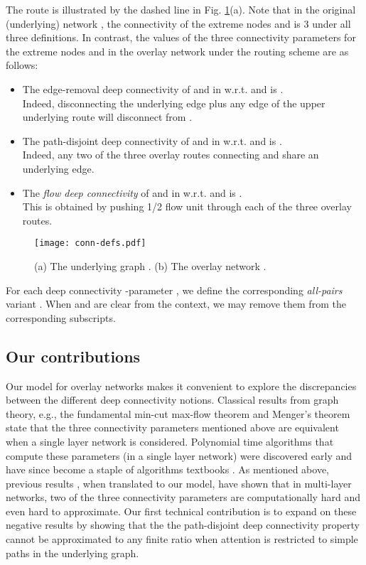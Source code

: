 \LongVersion \documentclass[11pt]{article}
\theoremstyle{definition}
\theoremstyle{plain}
\begin{document}
The route  is illustrated by the dashed line in
Fig. \ref{fig:conn-defs}(a).
Note that in the original (underlying) network , the connectivity of the
extreme nodes  and  is 3 under all three definitions. In contrast,
the values of the three connectivity parameters for the extreme nodes
 and  in the overlay network  under the routing scheme 
are as follows:

\begin{itemize}
\item
The edge-removal deep connectivity of  and  in 
w.r.t.  and  is .
\\
Indeed, disconnecting the underlying edge 
plus any edge of the upper underlying route will disconnect  from .
\item
The path-disjoint deep connectivity of  and  in 
w.r.t.  and  is .
\\
Indeed, any two of the three overlay routes connecting  and 
share an underlying edge.
\item
The \emph{flow deep connectivity} of  and  in 
w.r.t.  and  is .
\\
This is obtained by pushing 1/2 flow unit through each of the three
overlay routes.
\end{itemize}

\begin{figure}
\begin{center}
\texttt{[image: conn-defs.pdf]}
\end{center}
\caption{\label{fig:conn-defs}
(a) The underlying graph .
(b) The overlay network .}
\vspace*{-.5cm}
\end{figure}

For each deep connectivity -parameter , we define the corresponding
\emph{all-pairs} variant .
When  and  are clear from the context, we may remove them from the
corresponding subscripts.

\subsection{Our contributions}


Our model for overlay networks makes it convenient to explore the
discrepancies between the different deep connectivity notions.
Classical results from graph theory, e.g., the fundamental min-cut max-flow
theorem \cite{FF56,EFS56} and Menger's theorem \cite{Meng27} state that the
three connectivity parameters mentioned above are equivalent when a single
layer network is considered.
Polynomial time algorithms that compute these parameters (in a single
layer network) were discovered early \cite{FF56,Dini70,EK72} and have since
become a staple of algorithms textbooks \cite{CLRS09,KT05}.
As mentioned above, previous results \cite{prev,CDPRV07}, when translated to
our model, have shown that in multi-layer networks, two of the three
connectivity parameters are computationally hard and even hard to
approximate.
Our first technical contribution is to expand on these negative
results by showing that the the path-disjoint deep connectivity property
cannot be approximated to any finite ratio when attention is restricted to
simple paths in the underlying graph.
\end{document}
